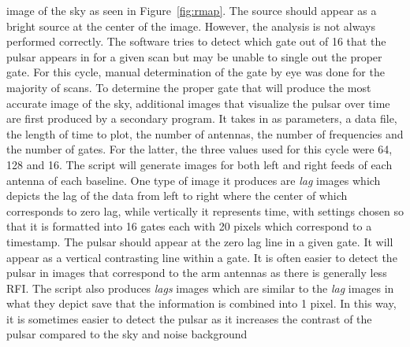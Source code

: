 \documentclass[a4paper,12pt]{article}
\begin{document}
image of the sky as seen in Figure~\ref{fig:rmap}. The source should appear as a bright source at the center of the image. However, the analysis is not always performed correctly. The software tries to detect which gate out of 16 that the pulsar appears in for a given scan but may be unable to single out the proper gate. For this cycle, manual determination of the gate by eye was done for the majority of scans. To determine the proper gate that will produce the most accurate image of the sky, additional images that visualize the pulsar over time are first produced by a secondary program. It takes in as parameters, a data file, the length of time to plot, the number of antennas, the number of frequencies and the number of gates. For the latter, the three values used for this cycle were 64, 128 and 16. The script will generate images for both left and right feeds of each antenna of each baseline. One type of image it produces are \emph{lag} images which depicts the lag of the data from left to right where the center of which corresponds to zero lag, while vertically it represents time, with settings chosen so that it is formatted into 16 gates each with 20 pixels which correspond to a timestamp. The pulsar should appear at the zero lag line in a given gate. It will appear as a vertical contrasting line within a gate. It is often easier to detect the pulsar in images that correspond to the arm antennas as there is generally less RFI. The script also produces \emph{lags} images which are similar to the \emph{lag} images in what they depict save that the information is combined into 1 pixel. In this way, it is sometimes easier to detect the pulsar as it increases the contrast of the pulsar compared to the sky and noise background
\end{document}
